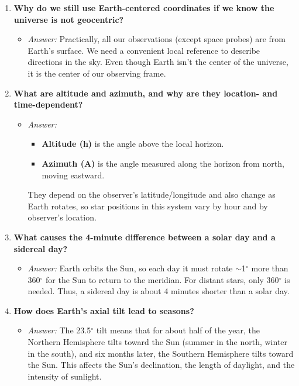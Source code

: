 \begin{enumerate}
  \item \textbf{Why do we still use Earth-centered coordinates if we know the universe is not geocentric?}
  \begin{itemize}
    \item \emph{Answer:} Practically, all our observations (except space probes) are from Earth’s surface. We need a convenient local reference to describe directions in the sky. Even though Earth isn’t the center of the universe, it is the center of our observing frame.
  \end{itemize}
  
  \item \textbf{What are altitude and azimuth, and why are they location- and time-dependent?}
  \begin{itemize}
    \item \emph{Answer:} 
    \begin{itemize}
      \item \textbf{Altitude (h)} is the angle above the local horizon.
      \item \textbf{Azimuth (A)} is the angle measured along the horizon from north, moving eastward.
    \end{itemize}
    They depend on the observer’s latitude/longitude and also change as Earth rotates, so star positions in this system vary by hour and by observer’s location.
  \end{itemize}
  
  \item \textbf{What causes the 4-minute difference between a solar day and a sidereal day?}
  \begin{itemize}
    \item \emph{Answer:} Earth orbits the Sun, so each day it must rotate $\sim$1$^\circ$ more than 360$^\circ$ for the Sun to return to the meridian. For distant stars, only 360$^\circ$ is needed. Thus, a sidereal day is about 4 minutes shorter than a solar day.
  \end{itemize}
  
  \item \textbf{How does Earth’s axial tilt lead to seasons?}
  \begin{itemize}
    \item \emph{Answer:} The 23.5$^\circ$ tilt means that for about half of the year, the Northern Hemisphere tilts toward the Sun (summer in the north, winter in the south), and six months later, the Southern Hemisphere tilts toward the Sun. This affects the Sun’s declination, the length of daylight, and the intensity of sunlight.
  \end{itemize}
  

\end{enumerate}
